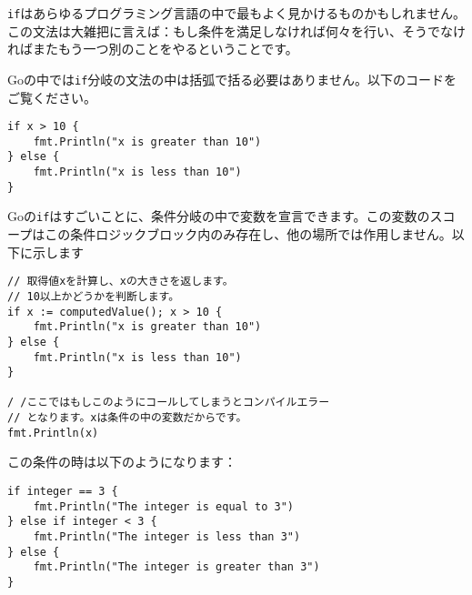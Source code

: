 \texttt{if}はあらゆるプログラミング言語の中で最もよく見かけるものかもしれません。この文法は大雑把に言えば：もし条件を満足しなければ何々を行い、そうでなければまたもう一つ別のことをやるということです。

Goの中では\texttt{if}分岐の文法の中は括弧で括る必要はありません。以下のコードをご覧ください。

\begin{lstlisting}[numbers=none]
if x > 10 {
    fmt.Println("x is greater than 10")
} else {
    fmt.Println("x is less than 10")
}
\end{lstlisting}

Goの\texttt{if}はすごいことに、条件分岐の中で変数を宣言できます。この変数のスコープはこの条件ロジックブロック内のみ存在し、他の場所では作用しません。以下に示します

\begin{lstlisting}[numbers=none]
// 取得値xを計算し、xの大きさを返します。
// 10以上かどうかを判断します。
if x := computedValue(); x > 10 {
    fmt.Println("x is greater than 10")
} else {
    fmt.Println("x is less than 10")
}

/ /ここではもしこのようにコールしてしまうとコンパイルエラー
// となります。xは条件の中の変数だからです。
fmt.Println(x)
\end{lstlisting}

この条件の時は以下のようになります：

\begin{lstlisting}[numbers=none]
if integer == 3 {
    fmt.Println("The integer is equal to 3")
} else if integer < 3 {
    fmt.Println("The integer is less than 3")
} else {
    fmt.Println("The integer is greater than 3")
}
\end{lstlisting}

